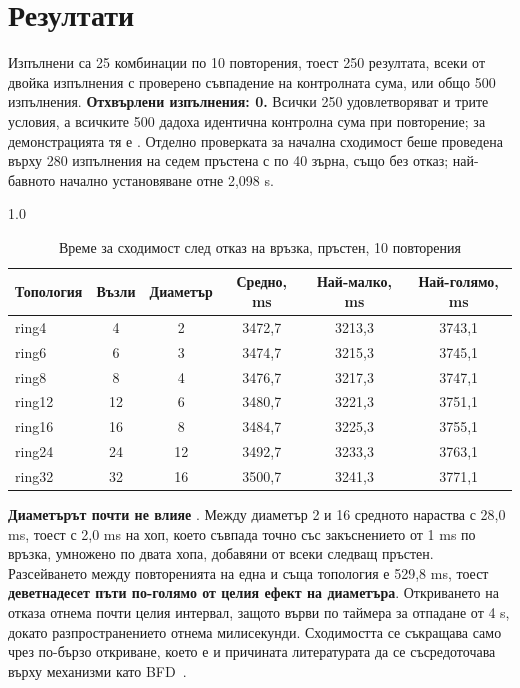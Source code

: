 \section{Резултати}
\label{sec:results}



Изпълнени са 25 комбинации по 10 повторения, тоест 250 резултата, всеки от двойка изпълнения с
проверено съвпадение на контролната сума, или общо 500 изпълнения. \textbf{Отхвърлени
изпълнения: 0.} Всички 250 удовлетворяват и трите условия, а всичките 500 дадоха идентична
контролна сума при повторение; за демонстрацията тя е
. Отделно
проверката за начална сходимост беше проведена върху 280 изпълнения на седем пръстена с по 40
зърна, също без отказ; най-бавното начално установяване отне 2,098 s.

\begin{table}[!htb]
\caption{Време за сходимост след отказ на връзка, пръстен, 10 повторения}
\label{tab:convergence}
\centering
\fontsize{11}{13}\selectfont
\begin{spacing}{1.0}
\begin{tabular}{lccccc}
\toprule
Топология & Възли & Диаметър & Средно, ms & Най-малко, ms & Най-голямо, ms \\
\midrule
ring4  & 4  & 2  & 3472,7 & 3213,3 & 3743,1 \\
ring6  & 6  & 3  & 3474,7 & 3215,3 & 3745,1 \\
ring8  & 8  & 4  & 3476,7 & 3217,3 & 3747,1 \\
ring12 & 12 & 6  & 3480,7 & 3221,3 & 3751,1 \\
ring16 & 16 & 8  & 3484,7 & 3225,3 & 3755,1 \\
ring24 & 24 & 12 & 3492,7 & 3233,3 & 3763,1 \\
ring32 & 32 & 16 & 3500,7 & 3241,3 & 3771,1 \\
\bottomrule
\end{tabular}
\end{spacing}
\end{table}

\textbf{Диаметърът почти не влияе} . Между диаметър 2 и 16 средното
нараства с 28,0 ms, тоест с 2,0 ms на хоп, което съвпада точно със закъснението от 1 ms по
връзка, умножено по двата хопа, добавяни от всеки следващ пръстен. Разсейването между
повторенията на една и съща топология е 529,8 ms, тоест \textbf{деветнадесет пъти по-голямо от
целия ефект на диаметъра}. Откриването на отказа отнема почти целия интервал, защото върви по
таймера за отпадане от 4 s, докато разпространението отнема милисекунди. Сходимостта се
съкращава само чрез по-бързо откриване, което е и причината литературата да се съсредоточава
върху механизми като BFD~\cite{rfc5880}.

